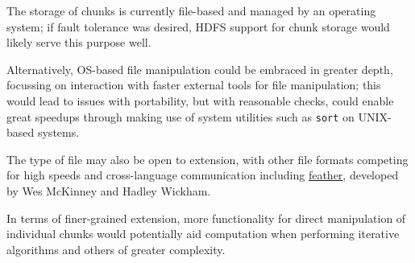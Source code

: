 \documentclass[10pt,a4paper]{article}
\begin{document}
The storage of chunks is currently file-based and managed by an
operating system; if fault tolerance was desired, HDFS support for
chunk storage would likely serve this purpose well.

Alternatively, OS-based file manipulation could be embraced in greater
depth, focussing on interaction with faster external tools for file
manipulation; this would lead to issues with portability, but with
reasonable checks, could enable great speedups through making use of
system utilities such as \texttt{sort} on UNIX-based systems.

The type of file may also be open to extension, with other file
formats competing for high speeds and cross-language communication
including \href{https://github.com/wesm/feather}{feather}, developed
by Wes McKinney and Hadley Wickham\cite{wes16}.

In terms of finer-grained extension, more functionality for direct
manipulation of individual chunks would potentially aid computation
when performing iterative algorithms and others of greater complexity.

\printbibliography{}
\end{document}
